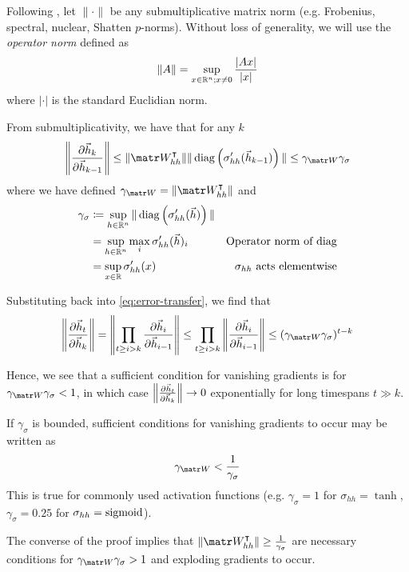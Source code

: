 Following \citet{Pascanu2012}, let $\| \cdot \|$ be any
submultiplicative matrix norm (e.g. Frobenius, spectral, nuclear, Shatten
$p$-norms). Without loss of generality, we will use the \emph{operator norm}
defined as
\begin{equation}
    \| A \| = \sup_{x \in \mathbb{R}^n; x \neq 0} \frac{|A x|}{|x|}
\end{equation}
where $|\cdot|$ is the standard Euclidian norm.

From submultiplicativity, we have that for any $k$
\begin{equation}
    \left\| \frac{\pd \h_k}{\pd \h_{k-1}} \right\|
    \leq \| \W_{hh}^\tp \| \| \diag\left( \sigma_{hh}'(\h_{k-1}) \right) \|
    \leq \gamma_{\W} \gamma_\sigma
\end{equation}
where we have defined $\gamma_{\W} = \| \W_{hh}^\tp \|$ and
\begin{align}
    \gamma_\sigma
    &\coloneqq \sup_{h \in \mathbb{R}^n} \| \operatorname*{diag} \left( \sigma_{hh}'(\vec{h}) \right) \|  &\\
    &= \sup_{h \in \mathbb{R}^n} \max_i \sigma_{hh}'(\vec{h})_i &\mbox{Operator norm of diag} \\
    &= \sup_{x \in \mathbb{R}} \sigma_{hh}'(x) &\mbox{$\sigma_{hh}$ acts elementwise}
\end{align}

Substituting back into \cref{eq:error-transfer}, we find that
\begin{equation}
    \left\| \frac{\pd \h_t}{\pd \h_k} \right\|
    = \left\| \prod_{t \geq i > k} \frac{\pd \h_i}{\pd \h_{i-1}} \right\|
    \leq  \prod_{t \geq i > k} \left\| \frac{\pd \h_i}{\pd \h_{i-1}} \right\|
    \leq (\gamma_{\W} \gamma_\sigma)^{t-k}
\end{equation}

Hence, we see that a sufficient condition for vanishing gradients is
for $\gamma_{\W} \gamma_\sigma < 1$, in which case $\left\| \frac{\partial \vec{h}_t}{\partial \vec{h}_k} \right\| \to 0$
exponentially for long timespans $t \gg k$. %

If $\gamma_\sigma$ is bounded, sufficient
conditions for vanishing gradients to occur may be written as
\begin{equation}
    \gamma_{\W} < \frac{1}{\gamma_\sigma}
    \label{eq:vanishing-gradients-suff}
\end{equation}
This is true for commonly used activation functions (e.g. $\gamma_\sigma = 1$
for $\sigma_{hh} = \tanh$, $\gamma_\sigma = 0.25$ for $\sigma_{hh} =
\operatorname*{sigmoid}$).

The converse of the proof implies that $\| \W_{hh}^\tp \| \geq
\frac{1}{\gamma_\sigma}$ are necessary conditions for $\gamma_{\W}
\gamma_\sigma > 1$ and exploding gradients to occur.

